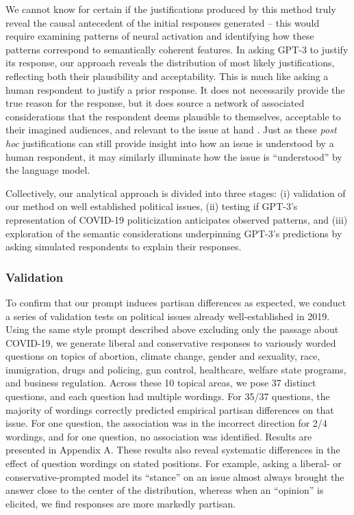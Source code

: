 \documentclass{article}
\begin{document}
We cannot know for certain if the justifications produced by this method
truly reveal the causal antecedent of the initial responses generated --
this would require examining patterns of neural activation and
identifying how these patterns correspond to semantically coherent
features. In asking GPT-3 to justify its response, our approach reveals
the distribution of most likely justifications, reflecting both their
plausibility and acceptability. This is much like asking a human
respondent to justify a prior response. It does not necessarily provide
the true reason for the response, but it does source a network of
associated considerations that the respondent deems plausible to
themselves, acceptable to their imagined audiences, and relevant to the
issue at hand \parencite{Tourangeau2000-tk}. Just as these \emph{post hoc} justifications can still
provide insight into how an issue is understood by a human respondent,
it may similarly illuminate how the issue is ``understood'' by the
language model.

Collectively, our analytical approach is divided into three stages: (i)
validation of our method on well established political issues, (ii)
testing if GPT-3's representation of COVID-19 politicization anticipates
observed patterns, and (iii) exploration of the semantic considerations
underpinning GPT-3's predictions by asking simulated respondents to
explain their responses.

\subsubsection*{Validation}

To confirm that our prompt induces partisan differences as expected, we
conduct a series of validation tests on political issues already
well-established in 2019. Using the same style prompt described above
excluding only the passage about COVID-19, we generate liberal and
conservative responses to variously worded questions on topics of
abortion, climate change, gender and sexuality, race, immigration, drugs
and policing, gun control, healthcare, welfare state programs, and
business regulation. Across these 10 topical areas, we pose 37 distinct
questions, and each question had multiple wordings. For 35/37 questions,
the majority of wordings correctly predicted empirical partisan
differences on that issue. For one question, the association was in the
incorrect direction for 2/4 wordings, and for one question, no
association was identified. Results are presented in Appendix A. These
results also reveal systematic differences in the effect of question
wordings on stated positions. For example, asking a liberal- or
conservative-prompted model its ``stance'' on an issue almost always
brought the answer close to the center of the distribution, whereas when
an ``opinion'' is elicited, we find responses are more markedly
partisan.
\end{document}

